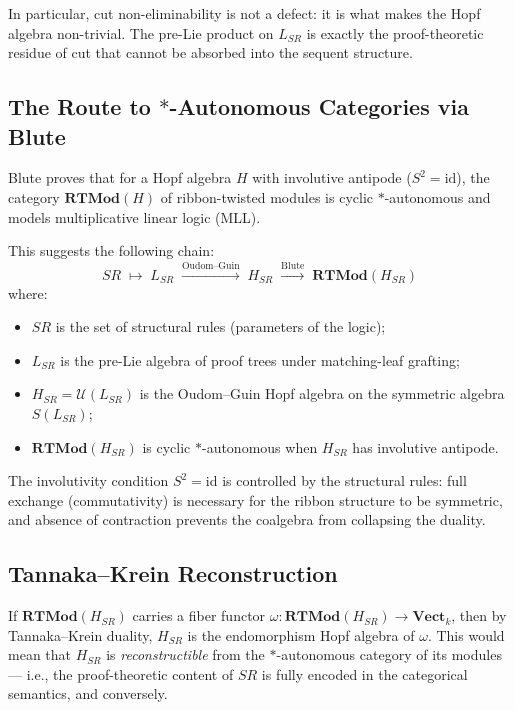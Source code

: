 \documentclass[a4paper,11pt]{report}
\begin{document}
In particular, cut non-eliminability is not a defect: it is what makes the Hopf algebra
non-trivial. The pre-Lie product on $L_{SR}$ is exactly the proof-theoretic residue of cut
that cannot be absorbed into the sequent structure.

\subsection*{The Route to $*$-Autonomous Categories via Blute}

Blute \cite{Blute93} proves that for a Hopf algebra $H$ with involutive antipode ($S^2 = \mathrm{id}$),
the category $\mathbf{RTMod}(H)$ of ribbon-twisted modules is cyclic $*$-autonomous and
models multiplicative linear logic (MLL).

This suggests the following chain:
\[
  SR
  \;\longmapsto\;
  L_{SR}
  \;\xrightarrow{\text{Oudom--Guin}}\;
  H_{SR}
  \;\xrightarrow{\text{Blute}}\;
  \mathbf{RTMod}(H_{SR})
\]
where:
\begin{itemize}
  \item $SR$ is the set of structural rules (parameters of the logic);
  \item $L_{SR}$ is the pre-Lie algebra of proof trees under matching-leaf grafting;
  \item $H_{SR} = \mathcal{U}(L_{SR})$ is the Oudom--Guin Hopf algebra on the symmetric algebra $S(L_{SR})$;
  \item $\mathbf{RTMod}(H_{SR})$ is cyclic $*$-autonomous when $H_{SR}$ has involutive antipode.
\end{itemize}

The involutivity condition $S^2 = \mathrm{id}$ is controlled by the structural rules:
full exchange (commutativity) is necessary for the ribbon structure to be symmetric,
and absence of contraction prevents the coalgebra from collapsing the duality.

\subsection*{Tannaka--Krein Reconstruction}

If $\mathbf{RTMod}(H_{SR})$ carries a fiber functor
$\omega \colon \mathbf{RTMod}(H_{SR}) \to \mathbf{Vect}_k$,
then by Tannaka--Krein duality, $H_{SR}$ is the endomorphism Hopf algebra of $\omega$.
This would mean that $H_{SR}$ is \emph{reconstructible} from the $*$-autonomous category
of its modules --- i.e., the proof-theoretic content of $SR$ is fully encoded in the
categorical semantics, and conversely.
\end{document}
